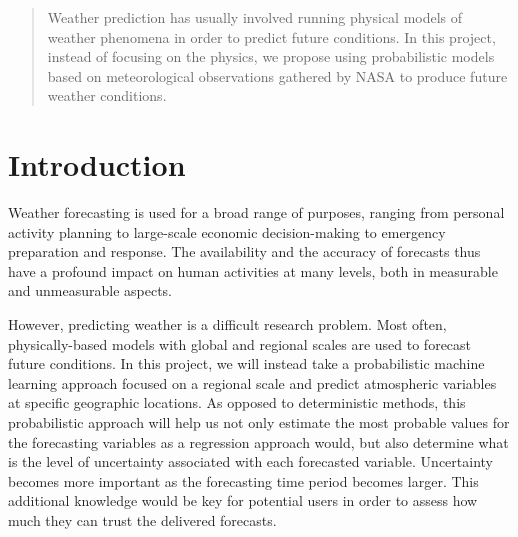 \documentclass{article}
\begin{document}
 


\begin{abstract} 
Weather prediction has usually involved running physical models of weather
phenomena in order to predict future conditions. In this project, instead of
focusing on the physics, we propose using probabilistic models based on
meteorological observations gathered by NASA to produce future weather
conditions.
\end{abstract} 

\section{Introduction}
\label{submission}

Weather forecasting is used for a broad range of purposes, ranging from personal
activity planning to large-scale economic decision-making to emergency
preparation and response. The availability and the accuracy of forecasts thus
have a profound impact on human activities at many levels, both in measurable and
unmeasurable aspects.

However, predicting weather is a difficult research problem. Most often,
physically-based models with global and regional scales are used to forecast
future conditions. In this project, we will instead take a probabilistic machine
learning approach focused on a regional scale and predict atmospheric variables
at specific geographic locations. As opposed to deterministic methods, this
probabilistic approach will help us not only estimate the most probable values
for the forecasting variables as a regression approach would, but also determine
what is the level of uncertainty associated with each forecasted variable.
Uncertainty becomes more important as the forecasting time period becomes
larger. This additional knowledge would be key for potential users in order to
assess how much they can trust the delivered forecasts.
\end{document}

